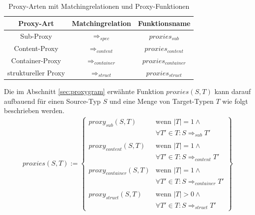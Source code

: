 \documentclass[a4paper,12pt]{article}
\begin{document}
\begin{table}[H]
\centering
\begin{tabular}{|c|c|c|}
\hline
\hline
\centering\textbf{Proxy-Art} & \textbf{Matchingrelation} & \textbf{Funktionsname}\\
\hline
\hline
Sub-Proxy
&  
$\Rightarrow_{spec}$
& 
$\mathit{proxies_{sub}}$
\\
\hline
Content-Proxy
& 
$\Rightarrow_{content}$
& 
$\mathit{proxies_{content}}$
\\
\hline
Container-Proxy
& 
$\Rightarrow_{container}$
& 
$\mathit{proxies_{container}}$
\\
\hline
struktureller Proxy
&
$\Rightarrow_{struct}$
& 
$\mathit{proxies_{struct}}$
 \\
\hline
\hline
\end{tabular}
\caption{Proxy-Arten mit Matchingrelationen und Proxy-Funktionen}
 \label{tab:baseMatcher}
\end{table}
\noindent
Die im Abschnitt \ref{sec:proxygram} erwähnte Funktion $\mathit{proxies(S,T)}$ kann darauf aufbauend für einen Source-Typ $S$ und eine Menge von Target-Typen $T$ wie folgt beschrieben werden.
\begin{gather*}
\mathit{proxies(S,T)} := 
\left\{\begin{array}{ll}
\mathit{proxy_{sub}(S,T)}	& \text{wenn } |T| = 1 \wedge \mathit{ }\\
& \forall T' \in T: S \Rightarrow_{sub} T'\\	
&\\
\mathit{proxy_{content}(S,T)}	& \text{wenn } |T| = 1 \wedge \mathit{ }\\
& \forall T' \in T: S \Rightarrow_{content} T' \\
&\\
\mathit{proxy_{container}(S,T)} & \text{wenn } |T| = 1 \wedge \mathit{ } \\
& \forall T' \in T: S \Rightarrow_{container} T' \\
&\\
\mathit{proxy_{struct}(S,T)} & \text{wenn } |T| > 0 \wedge \mathit{ } \\
&\forall T' \in T: S \Rightarrow_{struct} T'
		 \end{array}
\right\}
\end{gather*}
\end{document}
